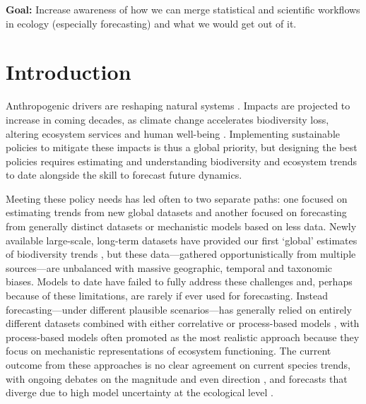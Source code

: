 \documentclass[11pt]{article}
\begin{document}
{\noindent \bf Goal:} Increase awareness of how we can merge statistical and scientific workflows in ecology (especially forecasting) and what we would get out of it.
\vspace*{0.5cm}

\section{Introduction}

Anthropogenic drivers are reshaping natural systems \citep{Diaz2019}. Impacts are projected to increase in coming decades, as climate change accelerates biodiversity loss, altering ecosystem services and human well-being \citep{IPBES2019}. Implementing sustainable policies to mitigate these impacts is thus a global priority, but designing the best policies requires estimating and understanding biodiversity and ecosystem trends to date alongside the skill to forecast future dynamics. %

Meeting these policy needs has led often to two separate paths: one focused on estimating trends from new global datasets and another focused on forecasting from generally distinct datasets or mechanistic models based on less data. Newly available large-scale, long-term datasets have provided our first `global' estimates of biodiversity trends \citep[e.g.][]{loh2005living,Dornelas2018}, but these data---gathered opportunistically from multiple sources---are unbalanced with massive geographic, temporal and taxonomic biases. Models to date have failed to fully address these challenges and, perhaps because of these limitations, are rarely if ever used for forecasting. 
Instead forecasting---under different plausible scenarios---has generally relied on entirely different datasets combined with either correlative or process-based models \citep{IPBES2019}, with process-based models often promoted as the most realistic approach \citep{Urban2016, Pilowsky2022} because they focus on mechanistic representations of ecosystem functioning. The current outcome from these approaches is no clear agreement on current species trends, with ongoing debates on the magnitude and even direction \citep{Dornelas2014, Leung2020, Buschke2021, Johnson2024}, and forecasts that diverge due to high model uncertainty at the ecological level \citep{Cheaib2012}. 
\end{document}
